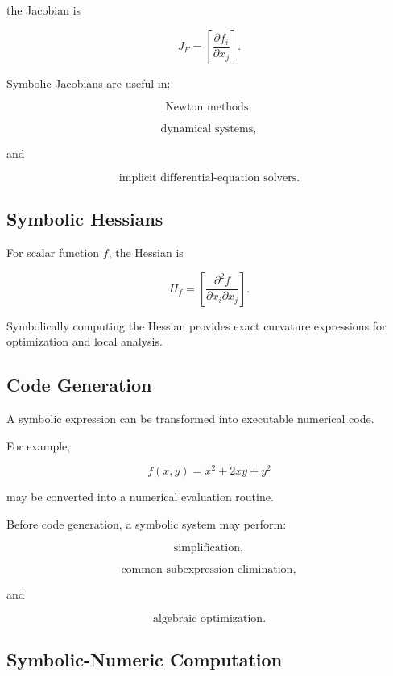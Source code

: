 the Jacobian is

\[
\boxed{
J_F
=
\left[
\frac{
\partial f_i
}{
\partial x_j
}
\right].
}
\]

Symbolic Jacobians are useful in:

\[
\boxed{
\text{Newton methods},
}
\]

\[
\boxed{
\text{dynamical systems},
}
\]

and

\[
\boxed{
\text{implicit differential-equation solvers}.
}
\]

\subsection{Symbolic Hessians}
\label{subsec:symbolic-hessians}

For scalar function \(f\), the Hessian is

\[
\boxed{
H_f
=
\left[
\frac{
\partial^2f
}{
\partial x_i\partial x_j
}
\right].
}
\]

Symbolically computing the Hessian provides exact curvature expressions for
optimization and local analysis.

\subsection{Code Generation}
\label{subsec:symbolic-code-generation}

A symbolic expression can be transformed into executable numerical code.

For example,

\[
f(x,y)
=
x^2
+
2xy
+
y^2
\]

may be converted into a numerical evaluation routine.

Before code generation, a symbolic system may perform:

\[
\boxed{
\text{simplification},
}
\]

\[
\boxed{
\text{common-subexpression elimination},
}
\]

and

\[
\boxed{
\text{algebraic optimization}.
}
\]

\subsection{Symbolic-Numeric Computation}
\label{subsec:symbolic-numeric-computation}

